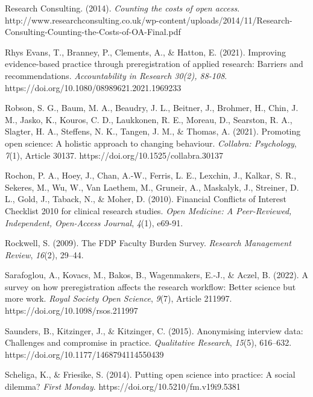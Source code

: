 \documentclass[meta, authordate]{jote-new-article}
\begin{document}
Research Consulting. (2014). \emph{Counting the costs of open access}. http://www.researchconsulting.co.uk/wp-content/uploads/2014/11/Research-Consulting-Counting-the-Costs-of-OA-Final.pdf



Rhys Evans, T., Branney, P., Clements, A., & Hatton, E. (2021). Improving evidence-based practice through preregistration of applied research: Barriers and recommendations. \emph{Accountability in Research 30(2), 88-108}. https://doi.org/10.1080/08989621.2021.1969233



Robson, S. G., Baum, M. A., Beaudry, J. L., Beitner, J., Brohmer, H., Chin, J. M., Jasko, K., Kouros, C. D., Laukkonen, R. E., Moreau, D., Searston, R. A., Slagter, H. A., Steffens, N. K., Tangen, J. M., & Thomas, A. (2021). Promoting open science: A holistic approach to changing behaviour. \emph{Collabra: Psychology}, \emph{7}(1), Article 30137. https://doi.org/10.1525/collabra.30137



Rochon, P. A., Hoey, J., Chan, A.-W., Ferris, L. E., Lexchin, J., Kalkar, S. R., Sekeres, M., Wu, W., Van Laethem, M., Gruneir, A., Maskalyk, J., Streiner, D. L., Gold, J., Taback, N., & Moher, D. (2010). Financial Conflicts of Interest Checklist 2010 for clinical research studies. \emph{Open Medicine: A Peer-Reviewed, Independent, Open-Access Journal}, \emph{4}(1), e69-91.



Rockwell, S. (2009). The FDP Faculty Burden Survey. \emph{Research Management Review}, \emph{16}(2), 29–44.



Sarafoglou, A., Kovacs, M., Bakos, B., Wagenmakers, E.-J., & Aczel, B. (2022). A survey on how preregistration affects the research workflow: Better science but more work. \emph{Royal Society Open Science}, \emph{9}(7), Article 211997. https://doi.org/10.1098/rsos.211997



Saunders, B., Kitzinger, J., & Kitzinger, C. (2015). Anonymising interview data: Challenges and compromise in practice. \emph{Qualitative Research}, \emph{15}(5), 616–632. https://doi.org/10.1177/1468794114550439



Scheliga, K., & Friesike, S. (2014). Putting open science into practice: A social dilemma? \emph{First Monday}. https://doi.org/10.5210/fm.v19i9.5381
\end{document}

